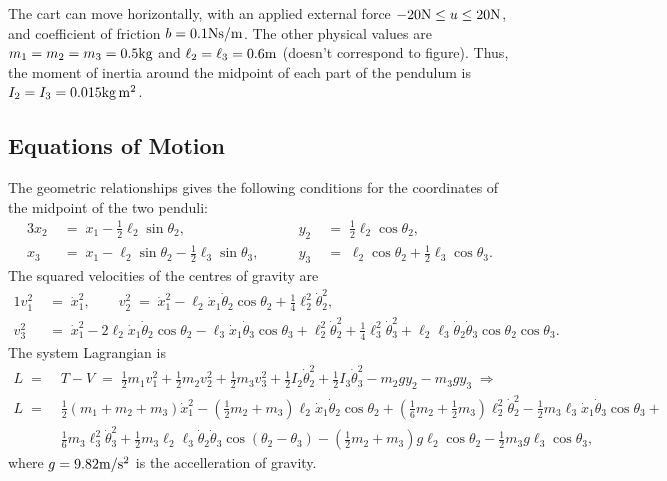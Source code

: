 \documentclass{article}
\begin{document}
The cart can move horizontally, with an applied external force
$-20{\rm N}\leq u\leq 20{\rm N}$,
and coefficient of friction $b=0.1{\rm Ns/m}$. The other physical
values are $m_1=m_2=m_3=0.5{\rm kg}$ and
$\ell_2=\ell_3=0.6{\rm m}$ (doesn't correspond to figure). Thus, the moment of
inertia around the midpoint of each part of the pendulum is
$I_2=I_3=0.015{\rm kg\,m^2}$.

\subsection*{Equations of Motion}

The geometric relationships gives the following conditions for the
coordinates of the midpoint of the two penduli:
\begin{alignat}{3}
x_2\;&=\;x_1-\tfrac{1}{2}\ell_2\sin\theta_2,&\qquad 
y_2\;&=\;\tfrac{1}{2}\ell_2\cos\theta_2,\\
x_3\;&=\;x_1-\ell_2\sin\theta_2-\tfrac{1}{2}\ell_3\sin\theta_3,&\qquad
y_3\;&=\;\ell_2\cos\theta_2+\tfrac{1}{2}\ell_3\cos\theta_3.
\end{alignat}
The squared velocities of the centres of gravity are
\begin{alignat}{1}
v_1^2\;&=\;\dot x_1^2, \qquad
v_2^2\;=\;\dot x_1^2-\ell_2\dot x_1\dot\theta_2\cos\theta_2+\tfrac{1}{4}\ell_2^2\dot\theta_2^2,\\
v_3^2\;&=\;\dot x_1^2-2\ell_2\dot x_1\dot\theta_2\cos\theta_2-
\ell_3\dot x_1\dot\theta_3\cos\theta_3+\ell_2^2\dot\theta_2^2+
\tfrac{1}{4}\ell_3^2\dot\theta_3^2+\ell_2\ell_3\dot\theta_2\dot\theta_3\cos\theta_2\cos\theta_3.
\end{alignat}
The system Lagrangian is
\[
\begin{split}
L\;=&\;T-V\;=\;
\tfrac{1}{2}m_1v_1^2+\tfrac{1}{2}m_2v_2^2+\tfrac{1}{2}m_3v_3^2+
\tfrac{1}{2}I_2\dot\theta_2^2+\tfrac{1}{2}I_3\dot\theta_3^2-m_2gy_2-m_3gy_3
\;\Rightarrow\\
L\;=&\;\tfrac{1}{2}(m_1+m_2+m_3)\dot x_1^2
-(\tfrac{1}{2}m_2+m_3)\ell_2\dot x_1\dot\theta_2\cos\theta_2 
+(\tfrac{1}{6}m_2+\tfrac{1}{2}m_3)\ell_2^2\dot\theta_2^2
-\tfrac{1}{2}m_3\ell_3\dot x_1\dot\theta_3\cos\theta_3+\\
&\;\tfrac{1}{6}m_3\ell_3^2\dot\theta_3^2
+\tfrac{1}{2}m_3\ell_2\ell_3\dot\theta_2\dot\theta_3\cos(\theta_2-\theta_3)
-(\tfrac{1}{2}m_2+m_3)g\ell_2\cos\theta_2-\tfrac{1}{2}m_3g\ell_3\cos\theta_3,
\end{split}
\]
where $g=9.82 {\rm m/s^2}$ is the accelleration of gravity.
\end{document}
